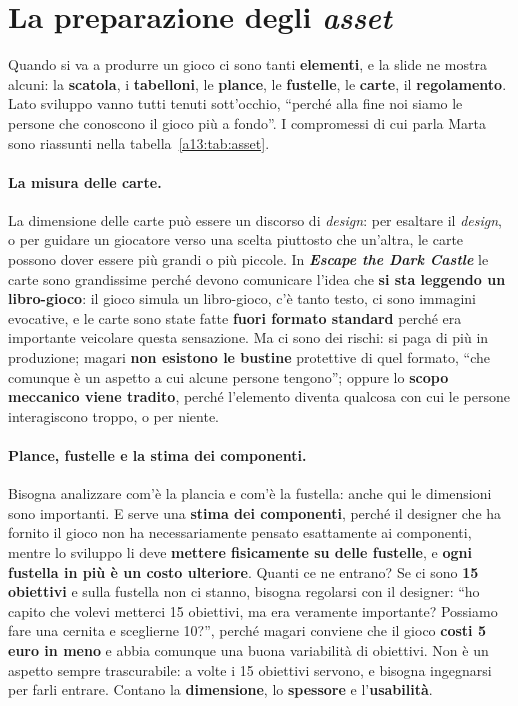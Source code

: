 \section{La preparazione degli \emph{asset}}
\label{a13:sec:asset}



Quando si va a produrre un gioco ci sono tanti \textbf{elementi}, e la slide ne mostra alcuni:
la \textbf{scatola}, i \textbf{tabelloni}, le \textbf{plance}, le \textbf{fustelle}, le
\textbf{carte}, il \textbf{regolamento}. Lato sviluppo vanno tutti tenuti sott'occhio,
``perché alla fine noi siamo le persone che conoscono il gioco più a fondo''. I compromessi
di cui parla Marta sono riassunti nella tabella~\ref{a13:tab:asset}.

\paragraph{La misura delle carte.} La dimensione delle carte può essere un discorso di
\emph{design}: per esaltare il \emph{design}, o per guidare un giocatore verso una scelta
piuttosto che un'altra, le carte possono dover essere più grandi o più piccole. In
\textbf{\emph{Escape the Dark Castle}} le carte sono grandissime perché devono comunicare
l'idea che \textbf{si sta leggendo un libro-gioco}: il gioco simula un libro-gioco, c'è tanto
testo, ci sono immagini evocative, e le carte sono state fatte \textbf{fuori formato standard}
perché era importante veicolare questa sensazione. Ma ci sono dei rischi: si paga di più in
produzione; magari \textbf{non esistono le bustine} protettive di quel formato, ``che comunque
è un aspetto a cui alcune persone tengono''; oppure lo \textbf{scopo meccanico viene tradito},
perché l'elemento diventa qualcosa con cui le persone interagiscono troppo, o per niente.

\paragraph{Plance, fustelle e la stima dei componenti.} Bisogna analizzare com'è la plancia e
com'è la fustella: anche qui le dimensioni sono importanti. E serve una \textbf{stima dei
componenti}, perché il designer che ha fornito il gioco non ha necessariamente pensato
esattamente ai componenti, mentre lo sviluppo li deve \textbf{mettere fisicamente su delle
fustelle}, e \textbf{ogni fustella in più è un costo ulteriore}. Quanti ce ne entrano? Se ci
sono \textbf{15 obiettivi} e sulla fustella non ci stanno, bisogna regolarsi con il designer:
``ho capito che volevi metterci 15 obiettivi, ma era veramente importante? Possiamo fare una
cernita e sceglierne 10?'', perché magari conviene che il gioco \textbf{costi 5 euro in meno}
e abbia comunque una buona variabilità di obiettivi. Non è un aspetto sempre trascurabile: a
volte i 15 obiettivi servono, e bisogna ingegnarsi per farli entrare. Contano la
\textbf{dimensione}, lo \textbf{spessore} e l'\textbf{usabilità}.

